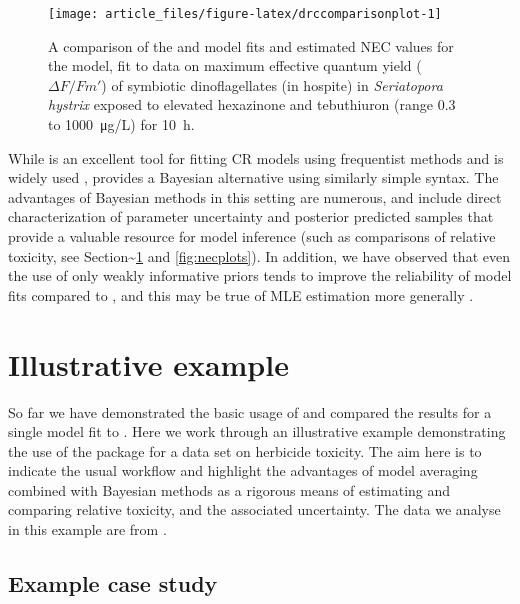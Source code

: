 \documentclass[
  shortnames]{jss}
\begin{document}
\begin{CodeChunk}
\begin{figure}[!ht]

{\centering \texttt{[image: article\_files/figure-latex/drccomparisonplot-1]} 

}

\caption{A comparison of the  and  model fits and estimated NEC values for the  model, fit to data on maximum effective quantum yield ($\Delta F / Fm'$) of symbiotic dinoflagellates (in hospite) in \textit{Seriatopora hystrix} exposed to elevated hexazinone and tebuthiuron (range 0.3 to \SI{1000}{\micro\gram/\liter}) for \SI{10}{\hour}.}\label{fig:drccomparisonplot}
\end{figure}
\end{CodeChunk}

While  is an excellent tool for fitting CR models using frequentist methods and is widely used \citep[ is cited nearly 2,000 times]{Ritz2016},  provides a Bayesian alternative using similarly simple syntax. The advantages of Bayesian methods in this setting are numerous, and include direct characterization of parameter uncertainty and posterior predicted samples that provide a valuable resource for model inference (such as comparisons of relative toxicity, see Section\textasciitilde{}\ref{iexample} and \autoref{fig:necplots}). In addition, we have observed that even the use of only weakly informative priors tends to improve the reliability of model fits compared to , and this may be true of MLE estimation more generally \citep{krull2020comparing}.

\section[Illustrative example]{Illustrative example}\label{iexample}

So far we have demonstrated the basic usage of  and compared the results for a single model fit to . Here we work through an illustrative example demonstrating the use of the package for a data set on herbicide toxicity. The aim here is to indicate the usual workflow and highlight the advantages of model averaging combined with Bayesian methods as a rigorous means of estimating and comparing relative toxicity, and the associated uncertainty. The data we analyse in this example are from \citet{jones2003meps}.

\hypertarget{example-case-study}{%
\subsection{Example case study}\label{example-case-study}}
\end{document}
